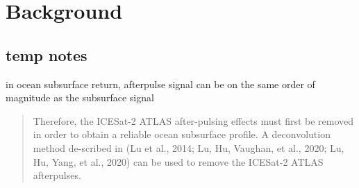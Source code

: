 \chapter{Background}



\section{temp notes}
in ocean subsurface return, afterpulse signal can be on the same order of magnitude as the subsurface signal \cite{}

\begin{quote}
    Therefore, the ICESat-2 ATLAS after-pulsing effects must first be removed in order to obtain a reliable ocean subsurface profile. A deconvolution method de-scribed in (Lu et al., 2014; Lu, Hu, Vaughan, et al., 2020; Lu, Hu, Yang, et al., 2020) can be used to remove the ICESat-2 ATLAS afterpulses. \citeauthor{Lu2021a}
\end{quote}


